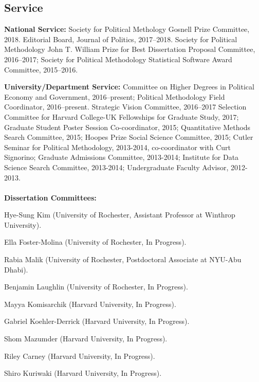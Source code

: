 \documentclass[margin,line,12pt]{res}
\newenvironment{list1}{
  \begin{list}{\ding{113}}{%
      \setlength{\itemsep}{0in}
      \setlength{\parsep}{0in} \setlength{\parskip}{0in}
      \setlength{\topsep}{0in} \setlength{\partopsep}{0in} 
      \setlength{\leftmargin}{0.83 cm}}}{\end{list}}
\begin{document}
\begin{resume}
\section{\sc Service}

\textbf{National Service:} Society for Political Methology Gosnell Prize Committee, 2018. Editorial Board, Journal of Politics, 2017--2018.  Society for Political Methodology John T. William Prize for Best Dissertation Proposal Committee, 2016--2017; Society for Political Methodology Statistical Software Award Committee, 2015--2016.

\textbf{University/Department Service:} Committee on Higher Degrees in Political Economy and Government, 2016--present; Political Methodology Field Coordinator, 2016--present. Strategic Vision Committee, 2016--2017 Selection Committee for Harvard College-UK Fellowships for Graduate Study, 2017; Graduate Student Poster Session Co-coordinator, 2015; Quantitative Methods Search Committee, 2015; Hoopes Prize Social Science Committee, 2015; Cutler Seminar for Political Methodology, 2013-2014, co-coordinator with Curt Signorino; Graduate Admissions Committee, 2013-2014; Institute for Data Science Search Committee, 2013-2014; Undergraduate Faculty Advisor, 2012-2013. \\ 
\\
\textbf{Dissertation Committees:}
\begin{list1}
\item[] Hye-Sung Kim (University of Rochester, Assistant Professor at Winthrop University).
\item[] Ella Foster-Molina (University of Rochester, In Progress).
\item[] Rabia Malik (University of Rochester, Postdoctoral Associate at NYU-Abu Dhabi).
\item[] Benjamin Laughlin (University of Rochester, In Progress).
\item[] Mayya Komisarchik (Harvard University, In Progress).
\item[] Gabriel Koehler-Derrick (Harvard University, In Progress).
\item[] Shom Mazumder (Harvard University, In Progress).
\item[] Riley Carney (Harvard University, In Progress).
\item[] Shiro Kuriwaki (Harvard University, In Progress).
\end{list1}


\end{resume}
\end{document}
